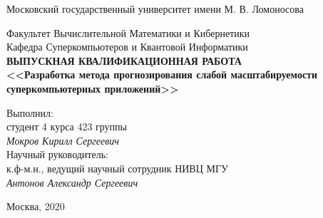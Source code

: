 \begin{center}
    Московский государственный университет имени М. В. Ломоносова

    \bigskip

    \bigskip
    Факультет Вычислительной Математики и Кибернетики\\
    Кафедра Суперкомпьютеров и Квантовой Информатики\\[10mm]

    \textsf{\large\bfseries
        ВЫПУСКНАЯ КВАЛИФИКАЦИОННАЯ РАБОТА\\[10mm]
        <<Разработка метода прогнозирования слабой масштабируемости суперкомпьютерных приложений>>
    }\\[10mm]

    \begin{flushright}
        \parbox{0.5\textwidth}{
            Выполнил:\\
            студент 4 курса 423 группы\\
            \emph{Мокров Кирилл Сергеевич}\\[5mm]
            Научный руководитель:\\
            к.ф-м.н., ведущий научный сотрудник НИВЦ МГУ\\
            \emph{Антонов Александр Сергеевич}
        }
    \end{flushright}

    \vspace{\fill}
    Москва, 2020
\end{center}
